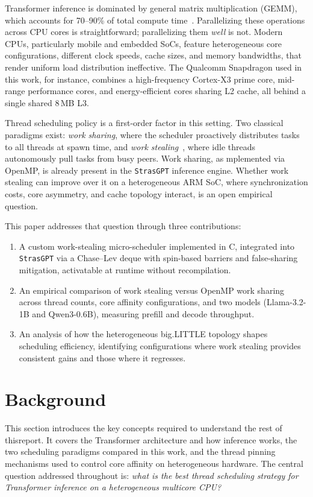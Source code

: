 \documentclass[11pt,english]{article}
\begin{document}
Transformer inference is dominated by general matrix multiplication (GEMM), which accounts for 70--90\% of total compute time~\cite{dice2021transformercpu}. Parallelizing these operations across CPU cores is straightforward; parallelizing them \emph{well} is not. Modern CPUs, particularly mobile and embedded SoCs, feature heterogeneous core configurations, different clock speeds, cache sizes, and memory bandwidths, that render uniform load distribution ineffective. The Qualcomm Snapdragon used in this work, for instance, combines a high-frequency Cortex-X3 prime core, mid-range performance cores, and energy-efficient cores sharing L2 cache, all behind a single shared 8\,MB L3.

Thread scheduling policy is a first-order factor in this setting. Two classical paradigms exist: \emph{work sharing}, where the scheduler proactively distributes tasks to all threads at spawn time, and \emph{work stealing}~\cite{blumofe1999workstealing}, where idle threads autonomously pull tasks from busy peers. Work sharing, as mplemented via OpenMP, is already present in the \texttt{StrasGPT} inference engine. Whether work stealing can improve over it on a heterogeneous ARM SoC, where synchronization costs, core asymmetry, and cache topology interact, is an open empirical question.

This paper addresses that question through three contributions:
\begin{enumerate}
    \item A custom work-stealing micro-scheduler implemented in C, integrated into \texttt{StrasGPT} via a Chase--Lev deque with spin-based barriers and false-sharing mitigation, activatable at runtime without recompilation.
    \item An empirical comparison of work stealing versus OpenMP work sharing across thread counts, core affinity configurations, and two models (Llama-3.2-1B and Qwen3-0.6B), measuring prefill and decode throughput.
    \item An analysis of how the heterogeneous big.LITTLE topology shapes scheduling efficiency, identifying configurations where work stealing provides consistent gains and those where it regresses.
\end{enumerate}

\section{Background}
\label{sec:background}

This section introduces the key concepts required to understand the rest of thisreport. It covers the Transformer architecture and how inference works, the two scheduling paradigms compared in this work, and the thread pinning mechanisms used to control core affinity on heterogeneous hardware. The central question addressed throughout is: \emph{what is the best thread scheduling strategy for Transformer inference on a heterogeneous multicore CPU?}
\end{document}
